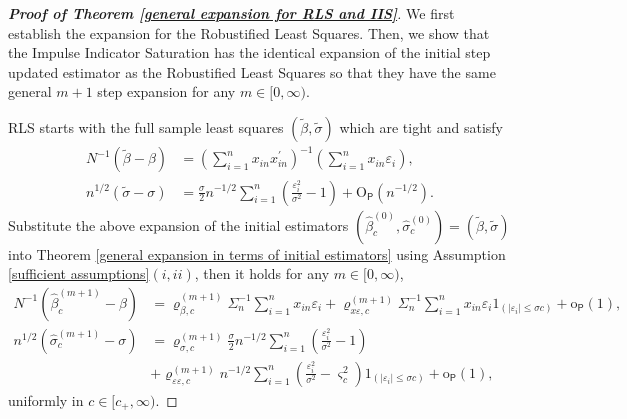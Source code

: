 \documentclass[11pt, letterpaper]{article}
\numberwithin{algorithm}{section}
\numberwithin{assumption}{section}
\numberwithin{lemma}{section}
\numberwithin{theorem}{section}
\numberwithin{corollary}{section}
\numberwithin{remark}{section}
\numberwithin{equation}{section}
\numberwithin{figure}{section}
\numberwithin{table}{section}
\begin{document}
\begin{proof}[\textnormal{\textbf{Proof of Theorem \ref{general expansion for RLS and IIS}}}]
We first establish the expansion for the Robustified Least Squares. Then, we show that the Impulse Indicator Saturation has the identical expansion of the initial step updated estimator as the Robustified Least Squares so that they have the same general $m + 1$ step expansion for any $m \in [0, \infty)$.

RLS starts with the full sample least squares $(\widetilde{\beta}, \widetilde{\sigma})$ which are tight and satisfy
\begin{align*}
N^{-1} (\widetilde{\beta} - \beta) & = (\sum_{i = 1}^{n} x_{in} x_{in}^{\prime})^{-1} (\sum_{i = 1}^{n} x_{in} \varepsilon_{i}), \\
n^{1/2} (\widetilde{\sigma} - \sigma) & = \frac{\sigma}{2} n^{-1/2} \sum_{i = 1}^{n} (\frac{\varepsilon_{i}^{2}}{\sigma^{2}} - 1) +  \mathrm{O}_{\mathsf{P}}(n^{-1/2}).
\end{align*}
Substitute the above expansion of the initial estimators $(\widehat{\beta}_{c}^{(0)}, \widehat{\sigma}_{c}^{(0)}) = (\widetilde{\beta}, \widetilde{\sigma})$ into Theorem \ref{general expansion in terms of initial estimators} using Assumption \ref{sufficient assumptions}$(i, ii)$, then it holds for any $m \in [0, \infty)$,
\begin{align*}
N^{-1} (\widehat{\beta}_{c}^{(m + 1)} - \beta) & = \varrho_{\beta, c}^{(m + 1)} \Sigma_{n}^{-1} \sum_{i = 1}^{n} x_{in} \varepsilon_{i} + \varrho_{x \varepsilon, c}^{(m + 1)} \Sigma_{n}^{-1} \sum_{i = 1}^{n} x_{in} \varepsilon_{i} 1_{(|\varepsilon_{i}| \le \sigma c)} +  \mathrm{o}_{\mathsf{P}}(1), \\
n^{1/2} (\widehat{\sigma}_{c}^{(m + 1)} - \sigma) & = \varrho_{\sigma, c}^{(m + 1)} \frac{\sigma}{2} n^{-1/2} \sum_{i = 1}^{n} (\frac{\varepsilon_{i}^{2}}{\sigma^{2}} - 1) \\
& + \varrho_{\varepsilon \varepsilon, c}^{(m + 1)} n^{-1/2} \sum_{i=1}^{n} (\frac{\varepsilon_{i}^{2}}{\sigma^{2}} - \varsigma_{c}^{2}) 1_{(|\varepsilon_{i}| \le \sigma c)} +  \mathrm{o}_{\mathsf{P}}(1),
\end{align*}
uniformly in $c \in [c_{+}, \infty)$.


\end{proof}
\end{document}
